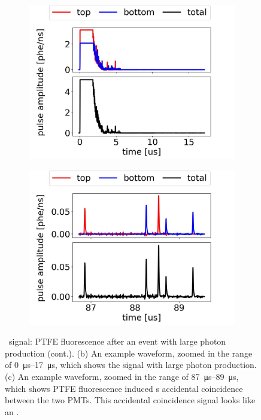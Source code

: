 \begin{figure}\ContinuedFloat
	\centering
	\begin{subfigure}[b]{0.7\textwidth}
		\centering
		\includegraphics[width=\figurewidth,clip,trim={0 0 0 0}]{Figures/GasTest/exampleWaveforms/proc64767PTFEFluo2P1.jpg}
		\caption{}
		\label{fig:ptfe fluo c}
	\end{subfigure}
	\par\bigskip
	\begin{subfigure}[b]{0.7\textwidth}
		\centering
		\includegraphics[width=\figurewidth,clip,trim={0 0 0 0}]{Figures/GasTest/exampleWaveforms/proc64767PTFEFluo2P2.jpg}
		\caption{}
		\label{fig:ptfe fluo d}
	\end{subfigure}
	\caption[\gtest\ signal: PTFE fluorescence after an event with large photon production (cont.).]{\gtest\ signal: PTFE fluorescence after an event with large photon production (cont.). (b) An example waveform, zoomed in the range of \SIrange{0}{17}{\us}, which shows the signal with large photon production.  (c) An example waveform, zoomed in the range of \SIrange{87}{89}{\us}, which shows PTFE fluorescence induced \sphe s accidental coincidence between the two PMTs. This accidental coincidence signal looks like an \ees .}
	\label{fig:ptfe fluo cont}
\end{figure}

